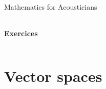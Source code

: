 \documentclass[10pt,a4paper]{report}
\begin{document}
\begin{center}
{\Large Mathematics for Acousticians}
 \begin{tabularx}{\linewidth}{c}
\hline
\end{tabularx}
\end{center}
\begin{center}
 {\Large \textbf{Exercices}\\}
\end{center}
 \begin{tabularx}{\linewidth}{c}
\hline
\end{tabularx}
\setcounter{chapter}{1}



\section{Vector spaces}











\end{document}

